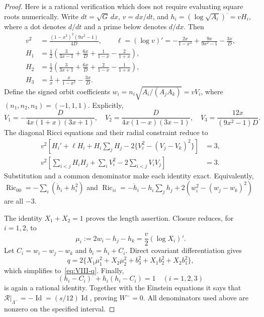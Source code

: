 \documentclass[11pt]{article}
\newcommand{\Ric}{\operatorname{Ric}}
\newcommand{\Id}{\operatorname{Id}}
\theoremstyle{definition}
\theoremstyle{remark}
\begin{document}
\begin{proof}
Here is a rational verification which does not require evaluating square
roots numerically. Write $dt=\sqrt G\,dx$, $v=dx/dt$, and
$h_i=(\log\sqrt{A_i})^{\boldsymbol\cdot}=vH_i$, where a dot denotes
$d/dt$ and a prime below denotes $d/dx$. Then
\begin{align*}
 v^2&=\frac{(1-x^2)^2(9x^2-1)}{4D},\qquad
 \ell=(\log v)'=-\frac{2x}{1-x^2}+\frac{9x}{9x^2-1}-\frac{3x}{D},\\
 H_1&=\frac12\left(\frac3{3x-1}+\frac{6x}{D}
               +\frac1{1-x}-\frac2{1+x}\right),\\
 H_2&=\frac12\left(\frac3{3x+1}+\frac{6x}{D}
               +\frac2{1-x}-\frac1{1+x}\right),\\
 H_3&=\frac1x+\frac{x}{1-x^2}-\frac{3x}{D}.
\end{align*}
Define the signed orbit coefficients
$w_i=n_i\sqrt{A_i/(A_jA_k)}=vV_i$, where
$(n_1,n_2,n_3)=(-1,1,1)$. Explicitly,
\begin{equation}
 V_1=-\frac{D}{4x(1+x)(3x+1)},\quad
 V_2=\frac{D}{4x(1-x)(3x-1)},\quad
 V_3=\frac{12x}{(9x^2-1)D}.
 \label{eq:VIII-V}
\end{equation}
The diagonal Ricci equations and their radial constraint reduce to
\begin{align}
 v^2\left[H_i'+\ell H_i+H_i\sum_jH_j
              -2\{V_i^2-(V_j-V_k)^2\}\right]&=3,\label{eq:VIII-ricci-cert}\\
 v^2\left[\sum_{i<j}H_iH_j+\sum_iV_i^2
                         -2\sum_{i<j}V_iV_j\right]&=3.\label{eq:VIII-ham-cert}
\end{align}
Substitution and a common denominator make each identity exact. Equivalently,
$\Ric_{00}=-\sum_i(\dot h_i+h_i^2)$ and
$\Ric_{ii}=-\dot h_i-h_i\sum_jh_j+2(w_i^2-(w_j-w_k)^2)$ are all $-3$.

The identity $X_1+X_2=1$ proves the length assertion.
Closure reduces, for $i=1,2$, to
\begin{equation}
 \mu_i:=2w_i-h_j-h_k=\frac v2(\log X_i)'.
 \label{eq:VIII-closure-cert}
\end{equation}
Let $C_i=w_i-w_j-w_k$ and $b_i=h_i+C_i$. Direct covariant
differentiation gives
\[
 q=2\{X_1\mu_1^2+X_2\mu_2^2+b_3^2+X_1b_2^2+X_2b_1^2\},
\]
which simplifies to~\eqref{eq:VIII-q}. Finally,
\begin{equation}
 (h_i-C_i)^{\boldsymbol\cdot}+h_i(h_i-C_i)=1
 \quad (i=1,2,3)
 \label{eq:VIII-Wminus-cert}
\end{equation}
is again a rational identity. Together with the Einstein equations it says
that $\mathcal R|_{\Lambda^-}=-\Id=(s/12)\Id$, proving $W^-=0$.
All denominators used above are nonzero on the specified interval.
\end{proof}
\end{document}
